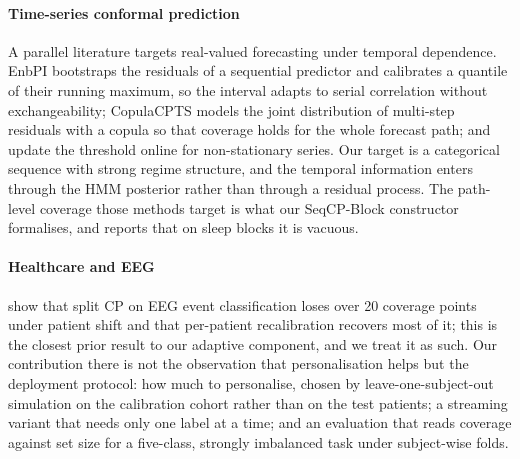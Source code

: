 \paragraph{Time-series conformal prediction}
A parallel literature targets real-valued forecasting under temporal
dependence. EnbPI \citep{xu2021} bootstraps the residuals of a sequential
predictor and calibrates a quantile of their running maximum, so the interval
adapts to serial correlation without exchangeability; CopulaCPTS
\citep{stankeviciute2021} models the joint distribution of multi-step
residuals with a copula so that coverage holds for the whole forecast path;
and \citet{zaffran2022} update the threshold online for non-stationary
series. Our target is a categorical sequence with strong regime structure,
and the temporal information enters through the HMM posterior rather than
through a residual process. The path-level coverage those methods target is
what our SeqCP-Block constructor formalises, and
 reports that on sleep blocks it is vacuous.

\paragraph{Healthcare and EEG}
\citet{chatterjee2026} show that split CP on EEG event classification loses
over 20 coverage points under patient shift and that per-patient
recalibration recovers most of it; this is the closest prior result to our
adaptive component, and we treat it as such. Our contribution there is not
the observation that personalisation helps but the deployment protocol: how
much to personalise, chosen by leave-one-subject-out simulation on the
calibration cohort rather than on the test patients; a streaming variant that
needs only one label at a time; and an evaluation that reads coverage against
set size for a five-class, strongly imbalanced task under subject-wise folds.
